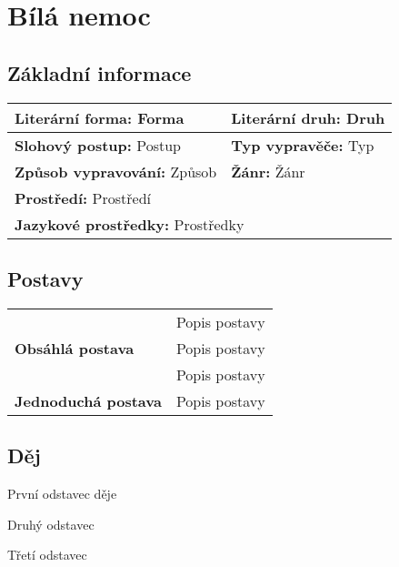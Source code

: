 \section{Bílá nemoc}
    \subsection*{Základní informace}
        \begin{center}
            \begin{tabular}{l|l}
                \textbf{Literární forma:} Forma & \textbf{Literární druh:} Druh \\
                \hline
                \textbf{Slohový postup:} Postup & \textbf{Typ vypravěče:} Typ \\
                \hline
                \textbf{Způsob vypravování:} Způsob & \textbf{Žánr:} Žánr \\
                \hline
                \multicolumn{2}{l}{\textbf{Prostředí:} Prostředí} \\
                \hline
                \multicolumn{2}{l}{\textbf{Jazykové prostředky:} Prostředky} \\
            \end{tabular}
        \end{center}
    \subsection*{Postavy}
        \begin{center}
            \begin{tabular}{l|l}
                \multirow{3}{15em}{\textbf{Obsáhlá postava}} & Popis postavy \\
                & Popis postavy \\
                & Popis postavy \\
                \hline
                \textbf{Jednoduchá postava} & Popis postavy \\
            \end{tabular}
        \end{center}
    \subsection*{Děj}
        První odstavec děje

        Druhý odstavec
        
        Třetí odstavec

